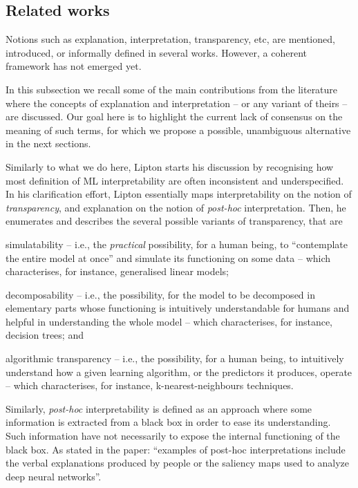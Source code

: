 \documentclass[12pt,a4paper,openright,twoside]{book}
\begin{document}
\subsection{Related works}\label{ssec:related}

Notions such as explanation, interpretation, transparency, etc, are mentioned, introduced, or informally defined in several works.
%
However, a coherent framework has not emerged yet.

In this subsection we recall some of the main contributions from the literature where the concepts of explanation and interpretation -- or any variant of theirs -- are discussed.
%
Our goal here is to highlight the current lack of consensus on the meaning of such terms, for which we propose a possible, unambiguous alternative in the next sections.

Similarly to what we do here, Lipton \cite{Lipton18} starts his discussion by recognising how most definition of ML interpretability are often inconsistent and underspecified.
%
In his clarification effort, Lipton essentially maps interpretability on the notion of \emph{transparency}, and explanation on the notion of \emph{post-hoc} interpretation.
%
Then, he enumerates and describes the several possible variants of transparency, that are 
%
\begin{enumerate*}[label=\emph{(\roman{*})}]
	\item simulatability -- i.e., the \emph{practical} possibility, for a human being, to ``contemplate the entire model at once'' and simulate its functioning on some data  -- which characterises, for instance, generalised linear models;
	
	\item decomposability -- i.e., the possibility, for the model to be decomposed in elementary parts whose functioning is intuitively understandable for humans and helpful in understanding the whole model -- which characterises, for instance, decision trees; and
	
	\item algorithmic transparency -- i.e., the possibility, for a human being, to intuitively understand how a given learning algorithm, or the predictors it produces, operate -- which characterises, for instance, k-nearest-neighbours techniques.
\end{enumerate*}
%
Similarly, \emph{post-hoc} interpretability is defined as an approach where some information is extracted from a black box in order to ease its understanding.
%
Such information have not necessarily to expose the internal functioning of the black box.
%
As stated in the paper: ``examples of post-hoc interpretations include the verbal explanations produced by people or the saliency maps used to analyze deep neural networks''.
\end{document}
